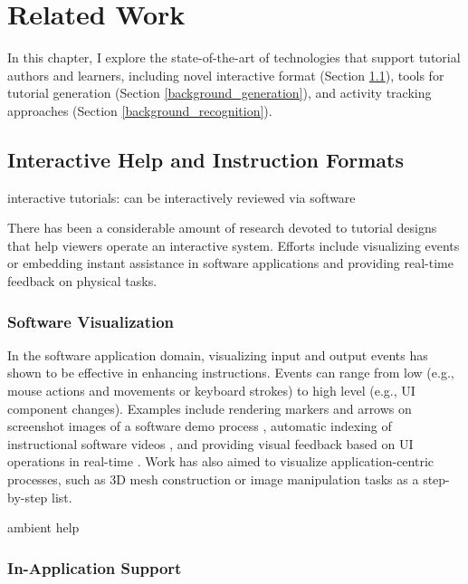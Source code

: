 
\chapter{Related Work}
\label{chapter_related_work}

In this chapter, I explore the state-of-the-art of technologies that support tutorial authors and learners, including novel interactive format (Section \ref{background_format}), tools for tutorial generation (Section \ref{background_generation}), and activity tracking approaches (Section \ref{background_recognition}).

\section{Interactive Help and Instruction Formats}
\label{background_format}

interactive tutorials: can be interactively reviewed via software

There has been a considerable amount of research devoted to tutorial designs that help viewers operate an interactive system. Efforts include visualizing events or embedding instant assistance in software applications and providing real-time feedback on physical tasks.

\subsection{Software Visualization}

In the software application domain, visualizing input and output events has shown to be effective in enhancing instructions. Events can range from low (e.g., mouse actions and movements or keyboard strokes) to high level (e.g., UI component changes). Examples include rendering markers and arrows on screenshot images of a software demo process \cite{Nakamura:2008:ASV:1449715.1449721, Grabler:2009jj}, automatic indexing of instructional software videos \cite{Banovic:2012kd}, and providing visual feedback based on UI operations in real-time \cite{Dixon:2010fb,Dixon:2011:CHP:1978942.1979086}. Work has also aimed to visualize application-centric processes, such as 3D mesh construction \cite{Denning:2011fy} or image manipulation tasks \cite{Grabler:2009jj} as a step-by-step list.

ambient help \cite{Matejka:2011:AH:1978942.1979349}

\subsection{In-Application Support}

